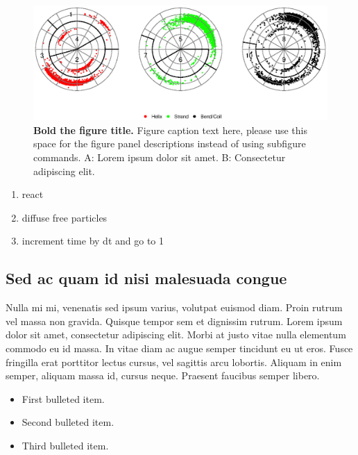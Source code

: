 \documentclass[10pt,letterpaper]{article}
\begin{document}
\begin{figure}[!h]
\begin{adjustwidth}{-2.25in}{0in} %
\includegraphics{Fig2}
\caption{{\bf Bold the figure title.}
Figure caption text here, please use this space for the figure panel descriptions instead of using subfigure commands. A: Lorem ipsum dolor sit amet. B: Consectetur adipiscing elit.}
\label{fig2}
\end{adjustwidth}
\end{figure}

\begin{enumerate}
	\item{react}
	\item{diffuse free particles}
	\item{increment time by dt and go to 1}
\end{enumerate}


\subsection*{Sed ac quam id nisi malesuada congue}

Nulla mi mi, venenatis sed ipsum varius, volutpat euismod diam. Proin rutrum vel massa non gravida. Quisque tempor sem et dignissim rutrum. Lorem ipsum dolor sit amet, consectetur adipiscing elit. Morbi at justo vitae nulla elementum commodo eu id massa. In vitae diam ac augue semper tincidunt eu ut eros. Fusce fringilla erat porttitor lectus cursus, vel sagittis arcu lobortis. Aliquam in enim semper, aliquam massa id, cursus neque. Praesent faucibus semper libero.

\begin{itemize}
	\item First bulleted item.
	\item Second bulleted item.
	\item Third bulleted item.
\end{itemize}
\end{document}
